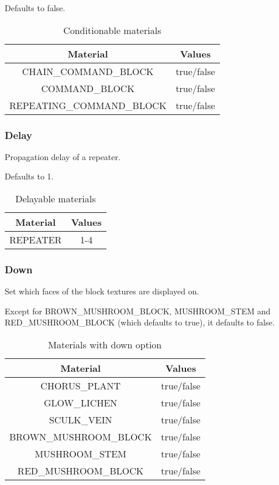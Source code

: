 Defaults to false.

\begin{table}[H]
	\centering
	\begin{tabular}{ |c|c| }
		\hline
		Material & Values \\
		\hline
		CHAIN\_COMMAND\_BLOCK & true/false \\
		COMMAND\_BLOCK & true/false \\
		REPEATING\_COMMAND\_BLOCK & true/false \\
		\hline
	\end{tabular}
	\caption{Conditionable materials}
\end{table}

\subsubsection{Delay}
Propagation delay of a repeater.

Defaults to 1.

\begin{table}[H]
	\centering
	\begin{tabular}{ |c|c| }
		\hline
		Material & Values \\
		\hline
		REPEATER & 1-4 \\
		\hline
	\end{tabular}
	\caption{Delayable materials}
\end{table}

\subsubsection{Down}
Set which faces of the block textures are displayed on.

Except for BROWN\_MUSHROOM\_BLOCK, MUSHROOM\_STEM and RED\_MUSHROOM\_BLOCK (which defaults to true), it defaults to false.


\begin{table}[H]
	\centering
	\begin{tabular}{ |c|c| }
		\hline
		Material & Values \\
		\hline
		CHORUS\_PLANT & true/false \\
		GLOW\_LICHEN & true/false \\
		SCULK\_VEIN & true/false \\
		BROWN\_MUSHROOM\_BLOCK & true/false \\
		MUSHROOM\_STEM & true/false \\
		RED\_MUSHROOM\_BLOCK & true/false \\
		\hline
	\end{tabular}
	\caption{Materials with down option}
\end{table}

